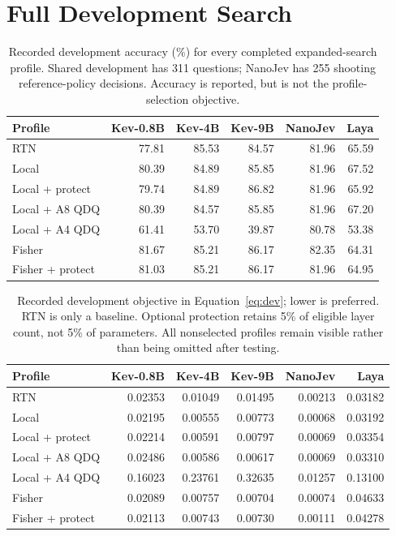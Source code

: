 \documentclass[10pt,twocolumn]{article}
\begin{document}
\section{Full Development Search}
\label{app:ablation}
\begin{table}[t]
\centering\small
\begin{tabular}{lrrrrr}
\toprule
Profile & Kev-0.8B & Kev-4B & Kev-9B & NanoJev & Laya\\
\midrule
RTN & 77.81 & 85.53 & 84.57 & 81.96 & 65.59 \\
Local & 80.39 & 84.89 & 85.85 & 81.96 & 67.52 \\
Local + protect & 79.74 & 84.89 & 86.82 & 81.96 & 65.92 \\
Local + A8 QDQ & 80.39 & 84.57 & 85.85 & 81.96 & 67.20 \\
Local + A4 QDQ & 61.41 & 53.70 & 39.87 & 80.78 & 53.38 \\
Fisher & 81.67 & 85.21 & 86.17 & 82.35 & 64.31 \\
Fisher + protect & 81.03 & 85.21 & 86.17 & 81.96 & 64.95 \\
\bottomrule
\end{tabular}
\caption{Recorded development accuracy (\%) for every completed
expanded-search profile. Shared development has 311 questions;
NanoJev has 255 shooting reference-policy decisions.
Accuracy is reported, but is not the profile-selection objective.}
\label{tab:devacc}
\end{table}
\begin{table}[t]
\centering\small
\begin{tabular}{lrrrrr}
\toprule
Profile & Kev-0.8B & Kev-4B & Kev-9B & NanoJev & Laya\\
\midrule
RTN & 0.02353 & 0.01049 & 0.01495 & 0.00213 & 0.03182 \\
Local & 0.02195 & 0.00555 & 0.00773 & 0.00068 & 0.03192 \\
Local + protect & 0.02214 & 0.00591 & 0.00797 & 0.00069 & 0.03354 \\
Local + A8 QDQ & 0.02486 & 0.00586 & 0.00617 & 0.00069 & 0.03310 \\
Local + A4 QDQ & 0.16023 & 0.23761 & 0.32635 & 0.01257 & 0.13100 \\
Fisher & 0.02089 & 0.00757 & 0.00704 & 0.00074 & 0.04633 \\
Fisher + protect & 0.02113 & 0.00743 & 0.00730 & 0.00111 & 0.04278 \\
\bottomrule
\end{tabular}
\caption{Recorded development objective in Equation~\eqref{eq:dev};
lower is preferred. RTN is only a baseline. Optional protection retains
5\% of eligible layer count, not 5\% of parameters. All nonselected
profiles remain visible rather than being omitted after testing.}
\label{tab:devobj}
\end{table}
\end{document}
